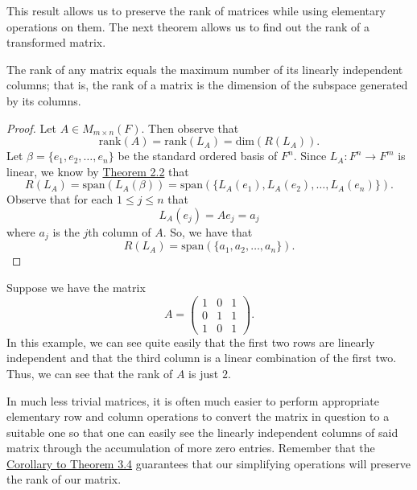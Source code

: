 This result allows us to preserve the rank of matrices while using elementary operations on them. The next theorem allows us to find out the rank of a transformed matrix.

\begin{theorem}
    The rank of any matrix equals the maximum number of its linearly independent columns; that is, the rank of a matrix is the dimension of the subspace generated by its columns.
\end{theorem}
\begin{proof}
Let \( A \in {M}_{m \times n }(F) \). Then observe that
\[  \text{rank}(A) = \text{rank}({L}_{A}) = \text{dim}(R({L}_{A})). \]
Let \( \beta  = \{ {e}_{1}, {e}_{2}, \dots, {e}_{n} \} \) be the standard ordered basis of \( F^{n} \). Since \( {L}_{A}: F^{n} \to F^{m} \) is linear, we know by {\hyperref[Spanning set for R(T)]{Theorem 2.2}} that 
\[  R({L}_{A}) = \text{span}({L}_{A}(\beta)) = \text{span}(\{ {L}_{A}({e}_{1}), {L}_{A}({e}_{2}), \dots, {L}_{A}({e}_{n}) \} ). \]
Observe that for each \( 1 \leq j \leq n \) that 
\[  {L}_{A}({e}_{j}) = A {e}_{j} = {a}_{j} \] where \( {a}_{j} \) is the \( j \)th column of \( A  \). So, we have that
\[  R({L}_{A}) = \text{span}(\{ {a}_{1}, {a}_{2}, \dots, {a}_{n} \}). \]
\end{proof}

\begin{eg}
   Suppose we have the matrix 
   \[  A = \begin{pmatrix}
       1 & 0 & 1 \\
       0 & 1 & 1 \\
       1 & 0 & 1 
   \end{pmatrix}. \]
   In this example, we can see quite easily that the first two rows are linearly independent and that the third column is a linear combination of the first two. Thus, we can see that the rank of \( A  \) is just \( 2  \). 
\end{eg}

\begin{remark}
    In much less trivial matrices, it is often much easier to perform appropriate elementary row and column operations to convert the matrix in question to a suitable one so that one can easily see the linearly independent columns of said matrix through the accumulation of more zero entries. Remember that the {\hyperref[Corollary to Theorem 3.4]{Corollary to Theorem 3.4}} guarantees that our simplifying operations will preserve the rank of our matrix.
\end{remark}

